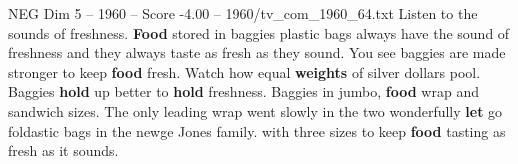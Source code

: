 \begin{textsample}{NEG Dim 5 – 1960 – Score -4.00 – 1960/tv\_com\_1960\_64.txt}  \label{ex:f5_neg_003}
Listen to the sounds of freshness. \textbf{Food} stored in baggies plastic bags always have the sound of freshness and they always taste as fresh as they sound.
You see baggies are made stronger to keep \textbf{food} fresh.
Watch how equal \textbf{weights} of silver dollars pool.
Baggies \textbf{hold} up better to \textbf{hold} freshness.
Baggies in jumbo, \textbf{food} wrap and sandwich sizes.
The only leading wrap went slowly in the two wonderfully \textbf{let} go foldastic bags in the newge Jones family. with three sizes to keep \textbf{food} tasting as fresh as it sounds.

\end{textsample}
